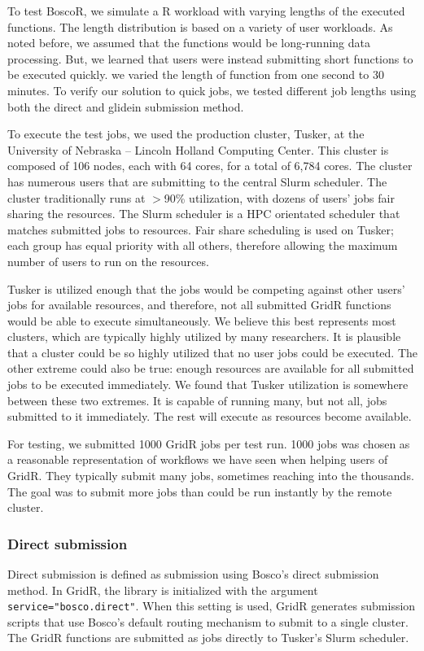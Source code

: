 To test BoscoR, we simulate a R workload with varying lengths of the executed functions.  The length distribution is based on a variety of user workloads.  As noted before, we assumed that the functions would be long-running data processing.  But, we learned that users were instead submitting short functions to be executed quickly.  we varied the length of function from one second to 30 minutes.  To verify our solution to quick jobs, we tested different job lengths using both the direct and glidein submission method.

To execute the test jobs, we used the production cluster, Tusker, at the University of Nebraska -- Lincoln Holland Computing Center.  This cluster is composed of 106 nodes, each with 64 cores, for a total of 6,784 cores.  The cluster has numerous users that are submitting to the central Slurm \cite{yoo2003slurm} scheduler.  The cluster traditionally runs at $>$90\% utilization, with dozens of users' jobs fair sharing the resources.  The Slurm scheduler is a HPC orientated scheduler that matches submitted jobs to resources.  Fair share scheduling is used on Tusker;  each group has equal priority with all others, therefore allowing the maximum number of users to run on the resources.

Tusker is utilized enough that the jobs would be competing against other users' jobs for available resources, and therefore, not all submitted GridR functions would be able to execute simultaneously.  We believe this best represents most clusters, which are typically highly utilized by many researchers.  It is plausible that a cluster could be so highly utilized that no user jobs could be executed. The other extreme could also be true: enough resources are available for all submitted jobs to be executed immediately.  We found that Tusker utilization is somewhere between these two extremes.  It is capable of running many, but not all, jobs submitted to it immediately.  The rest will execute as resources become available.

For testing, we submitted 1000 GridR jobs per test run. 1000 jobs was chosen as a reasonable representation of workflows we have seen when helping users of GridR.  They typically submit many jobs, sometimes reaching into the thousands.  The goal was to submit more jobs than could be run instantly by the remote cluster.

\subsubsection{Direct submission}
Direct submission is defined as submission using Bosco's direct submission method.  In GridR, the library is initialized with the argument \texttt{service="bosco.direct"}.  When this setting is used, GridR generates submission scripts that use Bosco's default routing mechanism to submit to a single cluster.  The GridR functions are submitted as jobs directly to Tusker's Slurm scheduler.

